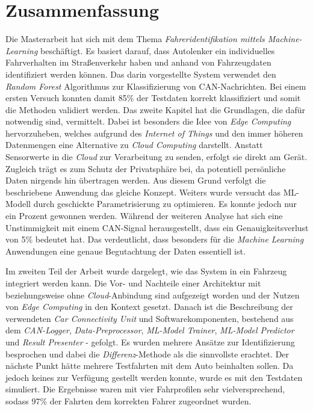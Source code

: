 %
%
%
%
%


\chapter{Zusammenfassung}
\label{chap:conclusion}

Die Masterarbeit hat sich mit dem Thema \textit{Fahreridentifikation mittels Machine-Learning} beschäftigt. Es basiert darauf, dass Autolenker ein individuelles Fahrverhalten im Straßenverkehr haben und anhand von Fahrzeugdaten identifiziert werden können. Das darin vorgestellte System verwendet den \textit{Random Forest} Algorithmus zur Klassifizierung von CAN-Nachrichten. Bei einem ersten Versuch konnten damit 85\% der Testdaten korrekt klassifiziert und somit die Methoden validiert werden. Das zweite Kapitel hat die Grundlagen, die dafür notwendig sind, vermittelt. Dabei ist besonders die Idee von \textit{Edge Computing} hervorzuheben, welches aufgrund des \textit{Internet of Things} und den immer höheren Datenmengen eine Alternative zu \textit{Cloud Computing} darstellt. Anstatt Sensorwerte in die \textit{Cloud} zur Verarbeitung zu senden, erfolgt sie direkt am Gerät. Zugleich trägt es zum Schutz der Privatsphäre bei, da potentiell persönliche Daten nirgends hin übertragen werden. Aus diesem Grund verfolgt die beschriebene Anwendung das gleiche Konzept. Weiters wurde versucht das ML-Modell durch geschickte Parametrisierung zu optimieren. Es konnte jedoch nur ein Prozent gewonnen werden. Während der weiteren Analyse hat sich eine Unstimmigkeit mit einem CAN-Signal herausgestellt, dass ein Genauigkeitsverlust von 5\% bedeutet hat. Das verdeutlicht, dass besonders für die \textit{Machine Learning} Anwendungen eine genaue Begutachtung der Daten essentiell ist.

Im zweiten Teil der Arbeit wurde dargelegt, wie das System in ein Fahrzeug integriert werden kann. Die Vor- und Nachteile einer Architektur mit beziehungsweise ohne \textit{Cloud}-Anbindung sind aufgezeigt worden und der Nutzen von \textit{Edge Computing} in den Kontext gesetzt. Danach ist die Beschreibung der verwendeten \textit{Car Connectivity Unit} und Softwarekomponenten, bestehend aus dem \textit{CAN-Logger}, \textit{Data-Preprocessor}, \textit{ML-Model Trainer}, \textit{ML-Model Predictor} und \textit{Result Presenter} - gefolgt. Es wurden mehrere Ansätze zur Identifizierung besprochen und dabei die \textit{Differenz}-Methode als die sinnvollste erachtet. Der nächste Punkt hätte mehrere Testfahrten mit dem Auto beinhalten sollen. Da jedoch keines zur Verfügung gestellt werden konnte, wurde es mit den Testdaten simuliert. Die Ergebnisse waren mit vier Fahrprofilen sehr vielversprechend, sodass 97\% der Fahrten dem korrekten Fahrer zugeordnet wurden.

